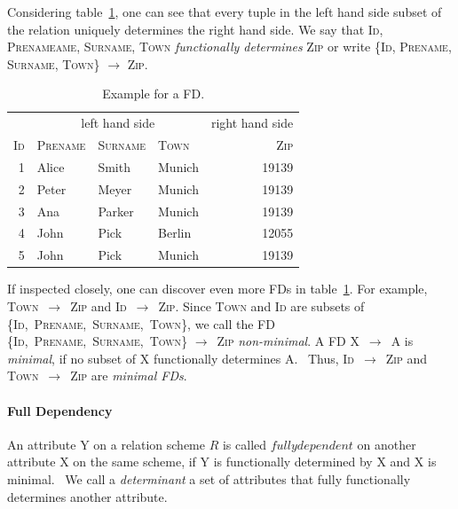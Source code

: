 Considering table~\ref{tab:fd-example}, one can see that every tuple in the left hand side subset of the relation uniquely determines the right hand side.
We say that \textsc{Id}, \textsc{Prenameame}, \textsc{Surname}, \textsc{Town} \emph{functionally determines} \textsc{Zip} or write \{\textsc{Id}, \textsc{Prename}, \textsc{Surname}, \textsc{Town}\} \( \rightarrow \) \textsc{Zip}.~\cite[p.~43]{MAI83}

\begin{table}[ht]
    \centering
    \begin{tabular}{rlllr}
        \toprule
        & \multicolumn{3}{c}{left hand side} & \multicolumn{1}{c}{right hand side} \\ \cmidrule(lr{.25em}){1-4} \cmidrule(l{4.75em}){4-5}
        \textsc{Id} & \textsc{Prename} & \textsc{Surname} & \textsc{Town} & \textsc{Zip} \\
        \midrule
        1 & Alice & Smith & Munich & 19139 \\
        2 & Peter& Meyer & Munich & 19139 \\
        3 & Ana & Parker & Munich & 19139  \\
        4 & John & Pick & Berlin & 12055 \\
        5 & John & Pick & Munich & 19139 \\
        \bottomrule
    \end{tabular}
    \caption{Example for a FD.}\label{tab:fd-example}
\end{table}


If inspected closely, one can discover even more FDs in table~\ref{tab:fd-example}.
For example, \textsc{Town}~\( \rightarrow \)~\textsc{Zip} and \textsc{Id}~\( \rightarrow \)~\textsc{Zip}.
Since \textsc{Town} and \textsc{Id} are subsets of \{\textsc{Id},~\textsc{Prename},~\textsc{Surname},~\textsc{Town}\}, we call the FD \{\textsc{Id},~\textsc{Prename},~\textsc{Surname},~\textsc{Town}\} \( \rightarrow \)~\textsc{Zip} \emph{non-minimal}.
A FD X~\( \rightarrow \)~A is \emph{minimal}, if no subset of X functionally determines A.~\cite[p.~2]{PAP15}
Thus, \textsc{Id}~\( \rightarrow \)~\textsc{Zip} and \textsc{Town}~\( \rightarrow \)~\textsc{Zip} are \emph{minimal FDs}.

\paragraph{Full Dependency} An attribute \textsc{Y} on a relation scheme \( R \) is called \( fully dependent \) on another attribute \textsc{X} on the same scheme, if \textsc{Y} is functionally determined by \textsc{X} and \textsc{X} is minimal.~\cite[p.~61]{SCH17}
We call a \emph{determinant} a set of attributes that fully functionally determines another attribute.



